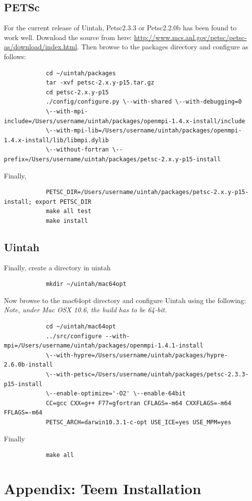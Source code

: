 \documentclass[12pt]{article}
\begin{document}
		\subsection{PETSc}
		For the current release of Uintah, Petsc2.3.3 or Petsc2.2.0b has been found to work well. Download the source from here: \url{http://www.mcs.anl.gov/petsc/petsc-as/download/index.html}.
		Then browse to the packages directory and configure as follows:
		{\small
		\begin{verbatim}
			cd ~/uintah/packages
			tar -xvf petsc-2.x.y-p15.tar.gz
			cd petsc-2.x.y-p15
			./config/configure.py \--with-shared \--with-debugging=0 
			\--with-mpi-include=/Users/username/uintah/packages/openmpi-1.4.x-install/include 
			\--with-mpi-lib=/Users/username/uintah/packages/openmpi-1.4.x-install/lib/libmpi.dylib 
			\--without-fortran \--prefix=/Users/username/uintah/packages/petsc-2.x.y-p15-install
		\end{verbatim}}
		Finally,
		{\small
		\begin{verbatim}
			PETSC_DIR=/Users/username/uintah/packages/petsc-2.x.y-p15-install; export PETSC_DIR
			make all test
			make install
		\end{verbatim}}
		
		\subsection{Uintah}
		Finally, create a directory in uintah
		{\small 
		\begin{verbatim}
			mkdir ~/uintah/mac64opt
		\end{verbatim}} %
		\noindent Now browse to the mac64opt directory and configure Uintah using the following:
		\emph{Note, under Mac OSX 10.6, the build has to be 64-bit.}
		{\small
		\begin{verbatim}
			cd ~/uintah/mac64opt
			../src/configure --with-mpi=/Users/username/uintah/packages/openmpi-1.4.1-install 
			\--with-hypre=/Users/username/uintah/packages/hypre-2.6.0b-install 
			\--with-petsc=/Users/username/uintah/packages/petsc-2.3.3-p15-install 
			\--enable-optimize='-O2' \--enable-64bit 
			CC=gcc CXX=g++ F77=gfortran CFLAGS=-m64 CXXFLAGS=-m64 FFLAGS=-m64
			PETSC_ARCH=darwin10.3.1-c-opt USE_ICE=yes USE_MPM=yes
		\end{verbatim}} %
		\noindent Finally
		{\small
		\begin{verbatim}
			make all
		\end{verbatim}}
\section{Appendix: Teem Installation}
\end{document}
